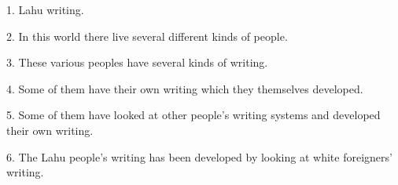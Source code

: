 \setcounter{footnote}{0}

1. Lahu writing.

2. In this world there live several different kinds of people.

3. These various peoples have several kinds of writing.

4. Some of them have their own writing which they themselves developed.

5. Some of them have looked at other people's writing systems and developed their own writing.

6. The Lahu people's writing has been developed by looking at white foreigners' writing.

